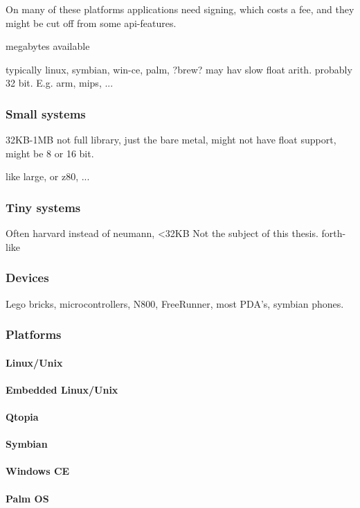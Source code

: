 On many of these platforms applications need signing, which costs a fee, and they might be cut off from some api-features.

megabytes available 

typically linux, symbian, win-ce, palm, ?brew?
may hav slow float arith.
probably 32 bit.
E.g. arm, mips, ...


\subsubsection{Small systems}
32KB-1MB
not full library,
just the bare metal,
might not have float support,
might be 8 or 16 bit.

like large, or z80, ...

\subsubsection{Tiny systems}
Often harvard instead of neumann,
<32KB
Not the subject of this thesis.
forth-like

\subsubsection{Devices}
Lego bricks, microcontrollers, N800, FreeRunner, most PDA's, symbian phones.
\subsubsection{Platforms}
\paragraph{Linux/Unix}
\paragraph{Embedded Linux/Unix}
\paragraph{Qtopia}
\paragraph{Symbian}
\paragraph{Windows CE}
\paragraph{Palm OS}
